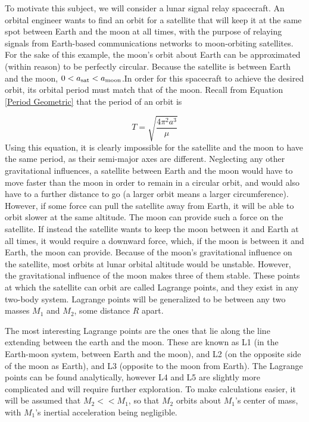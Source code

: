 \documentclass[../basicOrbitalDynamics.tex]{subfiles}
\begin{document}
To motivate this subject, we will consider a lunar signal relay spacecraft. An orbital engineer wants to find an orbit for a satellite that will keep it at the same spot between Earth and the moon at all times, with the purpose of relaying signals from Earth-based communications networks to moon-orbiting satellites. For the sake of this example, the moon's orbit about Earth can be approximated (within reason) to be perfectly circular. Because the satellite is between Earth and the moon, $0<{a}_\text{sat}<{a}_\text{moon}$.In order for this spacecraft to achieve the desired orbit, its orbital period must match that of the moon. Recall from Equation \eqref{Period Geometric} that the period of an orbit is

\[T=\sqrt{\frac{4\pi^2 a^3}{\mu}}\]
Using this equation, it is clearly impossible for the satellite and the moon to have the same period, as their semi-major axes are different. Neglecting any other gravitational influences, a satellite between Earth and the moon would have to move faster than the moon in order to remain in a circular orbit, and would also have to a further distance to go (a larger orbit means a larger circumference). However, if some force can pull the satellite away from Earth, it will be able to orbit slower at the same altitude. The moon can provide such a force on the satellite. If instead the satellite wants to keep the moon between it and Earth at all times, it would require a downward force, which, if the moon is between it and Earth, the moon can provide. Because of the moon's gravitational influence on the satellite, most orbits at lunar orbital altitude would be unstable. However, the gravitational influence of the moon makes three of them stable. These points at which the satellite can orbit are called Lagrange points, and they exist in any two-body system. Lagrange points will be generalized to be between any two masses $M_1$ and $M_2$, some distance $R$ apart.

The most interesting Lagrange points are the ones that lie along the line extending between the earth and the moon. These are known as L1 (in the Earth-moon system, between Earth and the moon), and L2 (on the opposite side of the moon as Earth), and L3 (opposite to the moon from Earth). The Lagrange points can be found analytically, however L4 and L5 are slightly more complicated and will require further exploration. To make calculations easier, it will be assumed that $M_2<<M_1$, so that $M_2$ orbits about $M_1$'s center of mass, with $M_1$'s inertial acceleration being negligible.
\end{document}
